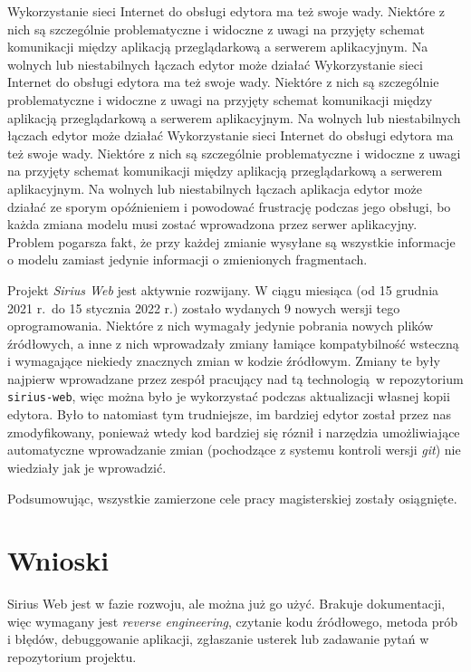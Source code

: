 Wykorzystanie sieci Internet do obsługi edytora ma też swoje wady. Niektóre z
nich są szczególnie problematyczne i widoczne z uwagi na przyjęty schemat
komunikacji między aplikacją przeglądarkową a serwerem aplikacyjnym. Na wolnych
lub niestabilnych łączach edytor może działać Wykorzystanie sieci Internet do
obsługi edytora ma też swoje wady. Niektóre z nich są szczególnie
problematyczne i widoczne z uwagi na przyjęty schemat komunikacji między
aplikacją przeglądarkową a serwerem aplikacyjnym. Na wolnych lub niestabilnych
łączach edytor może działać Wykorzystanie sieci Internet do obsługi edytora ma
też swoje wady. Niektóre z nich są szczególnie problematyczne i widoczne z
uwagi na przyjęty schemat komunikacji między aplikacją przeglądarkową a
serwerem aplikacyjnym. Na wolnych lub niestabilnych łączach aplikacja edytor
może działać ze sporym opóźnieniem i powodować frustrację podczas jego obsługi,
bo każda zmiana modelu musi zostać wprowadzona przez serwer aplikacyjny.
Problem pogarsza fakt, że przy każdej zmianie wysyłane są wszystkie informacje
o modelu zamiast jedynie informacji o zmienionych fragmentach.

Projekt \emph{Sirius Web} jest aktywnie rozwijany. W ciągu miesiąca (od 15
grudnia 2021 r.\ do 15 stycznia 2022 r.) zostało wydanych 9 nowych wersji tego
oprogramowania. Niektóre z nich wymagały jedynie pobrania nowych plików
źródłowych, a inne z nich wprowadzały zmiany łamiące kompatybilność wsteczną i
wymagające niekiedy znacznych zmian w kodzie źródłowym. Zmiany te były najpierw
wprowadzane przez zespół pracujący nad tą technologią w repozytorium
\texttt{sirius-web}, więc można było je wykorzystać podczas aktualizacji
własnej kopii edytora. Było to natomiast tym trudniejsze, im bardziej edytor
został przez nas zmodyfikowany, ponieważ wtedy kod bardziej się róznił i
narzędzia umożliwiające automatyczne wprowadzanie zmian (pochodzące z systemu
kontroli wersji \emph{git}) nie wiedziały jak je wprowadzić.

Podsumowując, wszystkie zamierzone cele pracy magisterskiej zostały osiągnięte.

\section{Wnioski}

Sirius Web jest w fazie rozwoju, ale można już go użyć. Brakuje dokumentacji,
więc wymagany jest \textit{reverse engineering}, czytanie kodu źródłowego,
metoda prób i błędów, debuggowanie aplikacji, zgłaszanie usterek lub zadawanie
pytań w repozytorium projektu.

